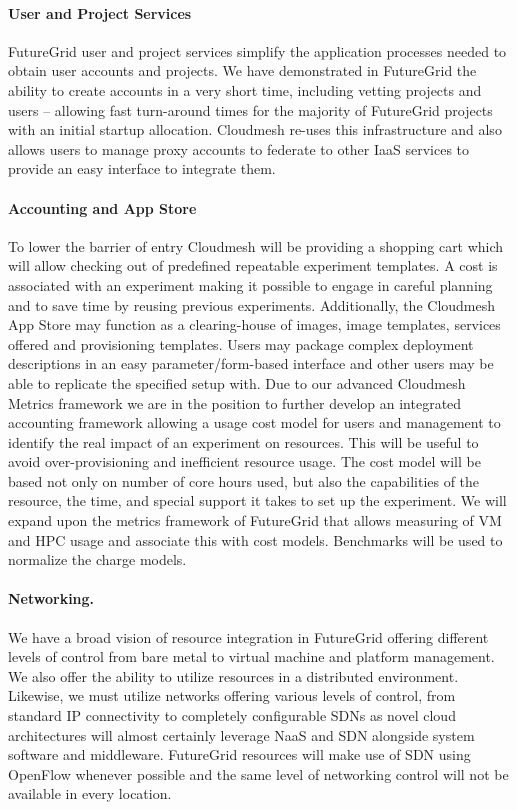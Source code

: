 \documentclass[graybox]{svmult}
\begin{document}
\paragraph{User and Project Services}


FutureGrid user and project services simplify the application processes needed to obtain user accounts and projects. We have demonstrated in FutureGrid the ability to create accounts in a very short time, including vetting projects and users – allowing fast turn-around times for the majority of FutureGrid projects with an initial startup allocation. Cloudmesh re-uses this infrastructure and also allows users to manage proxy accounts to federate to other IaaS services to provide an easy interface to integrate them.


\paragraph{Accounting and App Store}


To lower the barrier of entry Cloudmesh will be providing a shopping cart which will allow checking out of predefined repeatable experiment templates. A cost is associated with an experiment making it possible to engage in careful planning and to save time by reusing previous experiments. Additionally, the Cloudmesh App Store may function as a clearing-house of images, image templates, services offered and provisioning templates. Users may package complex deployment descriptions in an easy parameter/form-based interface and other users may be able to replicate the specified setup with.
Due to our advanced Cloudmesh Metrics framework we are in the position to further develop an integrated accounting framework allowing a usage cost model for users and management to identify the real impact of an experiment on resources. This will be useful to avoid over-provisioning and inefficient resource usage. The cost model will be based not only on number of core hours used, but also the capabilities of the resource, the time, and special support it takes to set up the experiment. We will expand upon the metrics framework of FutureGrid that allows measuring of VM and HPC usage and associate this with cost models. Benchmarks will be used to normalize the charge models.


\paragraph{Networking.}


We have a broad vision of resource integration in FutureGrid offering different levels of control from bare metal to virtual machine and platform management. We also offer the ability to utilize resources in a distributed environment. Likewise, we must utilize networks offering various levels of control, from standard IP connectivity to completely configurable SDNs as novel cloud architectures will almost certainly leverage NaaS and SDN alongside system software and middleware. FutureGrid resources will make use of SDN using OpenFlow whenever possible and the same level of networking control will not be available in every location. 
\end{document}
